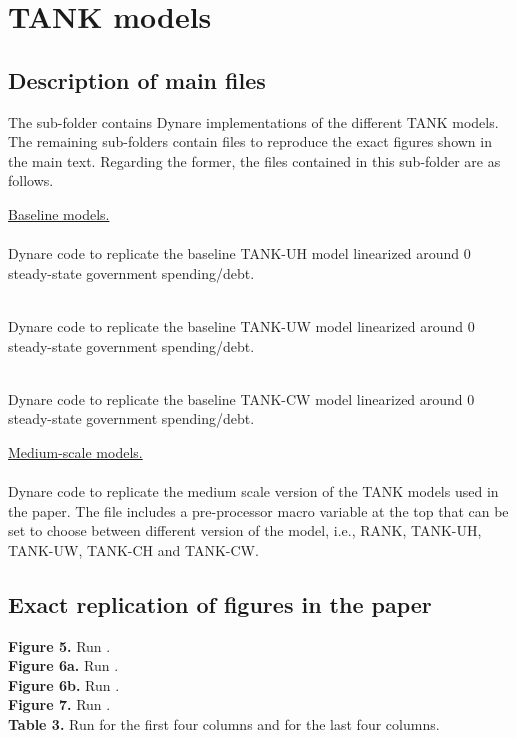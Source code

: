 \documentclass[12pt]{article}
\theoremstyle{plain}
\begin{document}
\section{TANK models}
\subsection{Description of main files}
The sub-folder  contains Dynare implementations \citep{adjemianDynareReferenceManual2018} of the different TANK models.  The remaining sub-folders contain files to reproduce the exact figures shown in the main text. Regarding the former, the files contained in this sub-folder are as follows.

\bigskip \noindent  \underline{Baseline models.}\\
 \\
Dynare code to replicate the baseline TANK-UH model linearized around 0 steady-state government spending/debt.

  \\
Dynare code to replicate the baseline TANK-UW model linearized around 0 steady-state government spending/debt.

 \\
Dynare code to replicate the baseline TANK-CW model linearized around 0 steady-state government spending/debt.

\bigskip \noindent  \underline{Medium-scale models.}\\
 \\
Dynare code to replicate the medium scale version of the TANK models used in the paper. The file includes a pre-processor macro variable at the top that can be set to choose between different version of the model, i.e., RANK, TANK-UH, TANK-UW, TANK-CH and TANK-CW.


\subsection{Exact replication of figures in the paper}
\textbf{Figure 5.} Run .  \\
\textbf{Figure 6a.} Run .  \\
\textbf{Figure 6b.} Run .  \\
\textbf{Figure 7.} Run .  \\
\textbf{Table 3.} Run  for the first four columns and  for the last four columns.  
\end{document}
